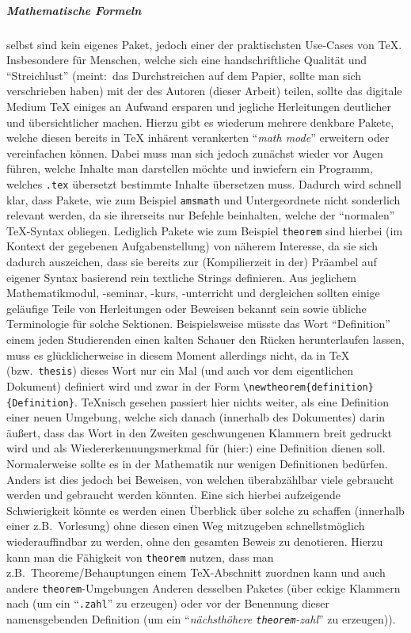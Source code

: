 \subparagraph*{Mathematische Formeln} selbst sind kein eigenes Paket, jedoch einer der praktischsten Use-Cases von \TeX{}. Insbesondere für Menschen, welche sich eine handschriftliche Qualität und \enquote{Streichlust} (meint:\ das Durchstreichen auf dem Papier, sollte man sich verschrieben haben) mit der des Autoren (dieser Arbeit) teilen, sollte das digitale Medium \TeX{} einiges an Aufwand ersparen und jegliche Herleitungen deutlicher und übersichtlicher machen. %
Hierzu gibt es wiederum mehrere denkbare Pakete, welche diesen bereits in \TeX{} inhärent verankerten \enquote{\textit{math mode}} erweitern oder vereinfachen können. Dabei muss man sich jedoch zunächst wieder vor Augen führen, welche Inhalte man darstellen möchte und inwiefern ein Programm, welches \texttt{.tex} übersetzt bestimmte Inhalte übersetzen muss. Dadurch wird schnell klar, dass Pakete, wie zum Beispiel \texttt{amsmath} und Untergeordnete nicht sonderlich relevant werden, da sie ihrerseits nur Befehle beinhalten, welche der \enquote{normalen} \TeX{}-Syntax obliegen. Lediglich Pakete wie zum Beispiel \texttt{theorem} sind hierbei (im Kontext der gegebenen Aufgabenstellung) von näherem Interesse, da sie sich dadurch auszeichen, dass sie bereits zur (Kompilierzeit in der) Präambel auf eigener Syntax basierend rein textliche Strings definieren. Aus jeglichem Mathematikmodul, -seminar, -kurs, -unterricht und dergleichen sollten einige geläufige Teile von Herleitungen oder Beweisen bekannt sein sowie übliche Terminologie für solche Sektionen. Beispielsweise müsste das Wort \enquote{Definition} einem jeden Studierenden einen kalten Schauer den Rücken herunterlaufen lassen, muss es glücklicherweise in diesem Moment allerdings nicht, da in \TeX{} (bzw.\ \texttt{thesis}) dieses Wort nur ein Mal (und auch vor dem eigentlichen Dokument) definiert wird und zwar in der Form \verb|\newtheorem{definition}{Definition}|. \TeX{}nisch gesehen passiert hier nichts weiter, als eine Definition einer neuen Umgebung, welche sich danach (innerhalb des Dokumentes) darin äußert, dass das Wort in den Zweiten geschwungenen Klammern breit gedruckt wird und als Wiedererkennungsmerkmal für (hier:) eine Definition dienen soll. Normalerweise sollte es in der Mathematik nur wenigen Definitionen bedürfen. Anders ist dies jedoch bei Beweisen, von welchen überabzählbar viele gebraucht werden und gebraucht werden könnten. Eine sich hierbei aufzeigende Schwierigkeit könnte es werden einen Überblick über solche zu schaffen (innerhalb einer z.B.\ Vorlesung) ohne diesen einen Weg mitzugeben schnellstmöglich wiederauffindbar zu werden, ohne den gesamten Beweis zu denotieren. Hierzu kann man die Fähigkeit von \texttt{theorem} nutzen, dass man z.B.\ Theoreme/Behauptungen einem \TeX{}-Abschnitt zuordnen kann und auch andere \texttt{theorem}-Umgebungen Anderen desselben Paketes (über eckige Klammern nach (um ein \enquote{\texttt{.zahl}} zu erzeugen) oder vor der Benennung dieser namensgebenden Definition (um ein \enquote{\textit{nächsthöhere \texttt{theorem}-zahl}} zu erzeugen)).%

